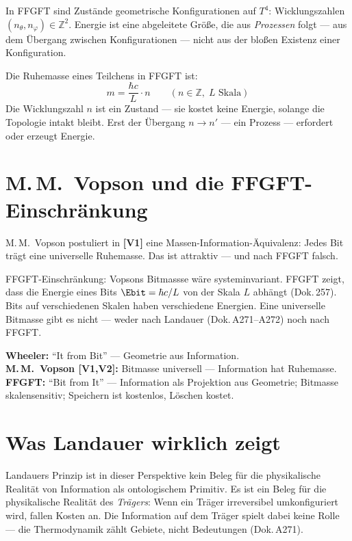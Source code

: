 In FFGFT sind Zustände geometrische Konfigurationen auf $T^4$:
Wicklungszahlen $(n_\theta, n_\varphi) \in \mathbb{Z}^2$. Energie ist eine
abgeleitete Größe, die aus \emph{Prozessen} folgt --- aus dem Übergang zwischen
Konfigurationen --- nicht aus der bloßen Existenz einer Konfiguration.

Die Ruhemasse eines Teilchens in FFGFT ist:
\[
  m = \frac{\hbar c}{L} \cdot n \qquad (n \in \mathbb{Z},\; L \text{ Skala})
\]
Die Wicklungszahl $n$ ist ein Zustand --- sie kostet keine Energie, solange
die Topologie intakt bleibt. Erst der Übergang $n \to n'$ --- ein Prozess ---
erfordert oder erzeugt Energie.

\section{M.\,M.~Vopson und die FFGFT-Einschränkung}

M.\,M.~Vopson postuliert in \textbf{[V1]} eine Massen-Information-Äquivalenz: Jedes Bit
trägt eine universelle Ruhemasse. Das ist attraktiv --- und nach FFGFT falsch.

FFGFT-Einschränkung: Vopsons Bitmassse wäre systeminvariant. FFGFT zeigt,
dass die Energie eines Bits $\Ebit = \hbar c / L$ von der Skala $L$ abhängt
(Dok.\,257). Bits auf verschiedenen Skalen haben verschiedene Energien.
Eine universelle Bitmasse gibt es nicht --- weder nach Landauer (Dok.\,A271--A272)
noch nach FFGFT.

\begin{ffgftbox}
\textbf{Wheeler:} ``It from Bit'' --- Geometrie aus Information.\\
\textbf{M.\,M.~Vopson \textbf{[V1,V2]}:} Bitmasse universell --- Information hat Ruhemasse.\\
\textbf{FFGFT:} ``Bit from It'' --- Information als Projektion aus Geometrie;
Bitmasse skalensensitiv; Speichern ist kostenlos, Löschen kostet.
\end{ffgftbox}

\section{Was Landauer wirklich zeigt}

Landauers Prinzip ist in dieser Perspektive kein Beleg für die
physikalische Realität von Information als ontologischem Primitiv.
Es ist ein Beleg für die physikalische Realität des \emph{Trägers}:
Wenn ein Träger irreversibel umkonfiguriert wird, fallen Kosten an.
Die Information auf dem Träger spielt dabei keine Rolle --- die
Thermodynamik zählt Gebiete, nicht Bedeutungen (Dok.\,A271).
